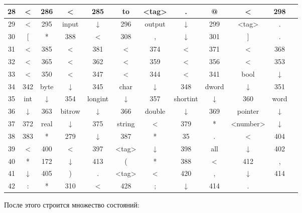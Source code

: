 \documentclass[12pt]{article}
\begin{document}
\begin{table}
\begin{small}
\begin{tabular}{|c|c|c|c|c|c|c|c|c|c|c|c|}
\hline
28&<&286&<&285&to&<tag>&.&@&<&298\\
\hline
29&<&295&input&↓&296&output&↓&299&<tag>&.\\
\hline
30&[&*&388&<&308&,&↓&301&]&.\\
\hline
31&<&385&<&381&<&374&<&371&<&368\\
\hline
32&<&365&<&362&<&359&<&356&<&353\\
\hline
33&<&350&<&347&<&344&<&341&bool&↓\\
\hline
34&342&byte&↓&345&char&↓&348&dword&↓&351\\
\hline
35&int&↓&354&longint&↓&357&shortint&↓&360&word\\
\hline
36&↓&363&bitrow&↓&366&double&↓&369&pointer&↓\\
\hline
37&372&real&↓&375&string&<&379&*&<number>&↓\\
\hline
38&383&*&279&↓&387&*&35&.&<&404\\
\hline
39&<&400&<&397&<tag>&↓&398&all&↓&402\\
\hline
40&*&172&↓&413&(&*&388&<&412&,\\
\hline
41&↓&405&)&.&<tag>&<&420&,&↓&414\\
\hline
42&:&*&310&<&428&;&↓&414&.&\ \\
\hline

\end{tabular}
\end{small}
\end{table}
\newpage
После этого строится множество состояний:\\
\end{document}
